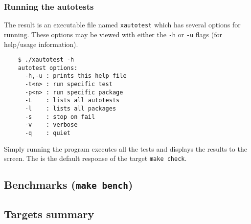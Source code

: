 \documentclass[11pt,twoside]{report}
\begin{document}
\subsubsection{Running the autotests}
The result is an executable file named {\tt xautotest} which has several
options for running.
These options may be viewed with either the {\tt -h} or {\tt -u} flags (for
help/usage information).
\begin{verbatim}
    $ ./xautotest -h
    autotest options:
      -h,-u : prints this help file
      -t<n> : run specific test
      -p<n> : run specific package
      -L    : lists all autotests
      -l    : lists all packages
      -s    : stop on fail
      -v    : verbose
      -q    : quiet
\end{verbatim}
Simply running the program executes all the tests and displays the results to
the screen.
The is the default response of the target {\tt make check}.

\subsection{Benchmarks ({\tt make bench})}
\label{ch:installation:targets:benchmarks}

\subsection{Targets summary}



%
%
\cleardoublepage
%


\appendix
%
%
\end{document}
